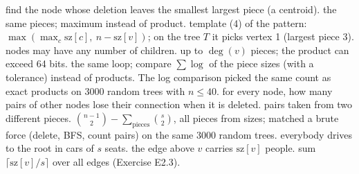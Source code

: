 \begin{variantsbox}
  {find the node whose deletion leaves the smallest largest piece (a centroid).}
  {the same pieces; maximum instead of product.}
  {template (4) of the pattern: $\max(\max_c \mathrm{sz}[c],\ n - \mathrm{sz}[v])$; on the tree $T$ it picks vertex 1 (largest piece 3).}
  {nodes may have any number of children.}
  {up to $\deg(v)$ pieces; the product can exceed 64 bits.}
  {the same loop; compare $\sum \log$ of the piece sizes (with a tolerance) instead of products. The log comparison picked the same count as exact products on $3000$ random trees with $n \le 40$.}
  {for every node, how many pairs of other nodes lose their connection when it is deleted.}
  {pairs taken from two different pieces.}
  {$\binom{n-1}{2} - \sum_{\text{pieces}} \binom{s}{2}$, all pieces from sizes; matched a brute force (delete, BFS, count pairs) on the same $3000$ random trees.}
  {everybody drives to the root in cars of $s$ seats.}
  {the edge above $v$ carries $\mathrm{sz}[v]$ people.}
  {sum $\lceil \mathrm{sz}[v] / s \rceil$ over all edges (Exercise E2.3).}
\end{variantsbox}
